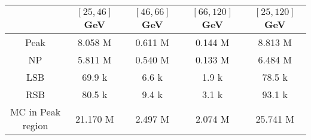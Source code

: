 \begin{tabular}{c|ccc|c}
 & $[25, 46]$ GeV & $[46, 66]$ GeV & $[66, 120]$ GeV & $[25, 120]$ GeV \\
\hline
Peak & 8.058 M & 0.611 M & 0.144 M & 8.813 M \\
NP & 5.811 M & 0.540 M & 0.133 M & 6.484 M \\
LSB & 69.9 k & 6.6 k & 1.9 k & 78.5 k \\
RSB & 80.5 k & 9.4 k & 3.1 k & 93.1 k \\
MC in Peak region & 21.170 M & 2.497 M & 2.074 M & 25.741 M \\
\end{tabular}
